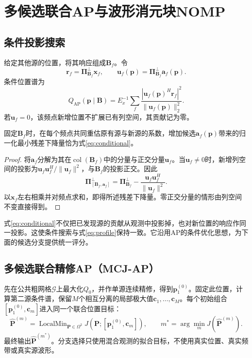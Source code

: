 \section{多候选联合AP与波形消元块NOMP}\label{sec:methods}
\subsection{条件投影搜索}
给定其他源的位置，将其响应组成$\bm B_f$。令
\begin{equation}
 \bm r_f=\bm\Pi_{\bm B_f}^{\perp}\bm x_f,\qquad
 \bm u_f(\bm p)=\bm\Pi_{\bm B_f}^{\perp}\bm a_f(\bm p).
\end{equation}
条件位置谱为
\begin{equation}
 Q_{\mathrm{AP}}(\bm p\mid\bm B)
 =E_x^{-1}\sum_f\frac{|\bm u_f(\bm p)^H\bm r_f|^2}
 {\|\bm u_f(\bm p)\|_2^2}.\label{eq:conditional}
\end{equation}
若$\bm u_f=0$，该频点新增位置不扩展已有列空间，其贡献记为零。

\begin{proposition}[条件谱与联合残差]\label{prop:conditional}
固定$\bm B_f$时，在每个频点共同重估原有源与新源的系数，增加候选$\bm a_f(\bm p)$带来的归一化最小残差下降量恰为式\eqref{eq:conditional}。
\end{proposition}
\begin{proof}
将$\bm a_f$分解为其在$\operatorname{col}(\bm B_f)$中的分量与正交分量$\bm u_f$。当$\bm u_f\ne0$时，新增列空间的投影为$\bm u_f\bm u_f^H/\|\bm u_f\|^2$，与$\bm B_f$的投影正交。因此
\begin{equation}
 \bm\Pi_{[\bm B_f,\bm a_f]}^{\perp}
 =\bm\Pi_{\bm B_f}^{\perp}
 -\frac{\bm u_f\bm u_f^H}{\|\bm u_f\|^2} .
\end{equation}
以$\bm x_f$左右相乘并对频点求和，即得所述残差下降量。零正交分量的情形由列空间不变直接得到。
\end{proof}

式\eqref{eq:conditional}不仅把已发现源的贡献从观测中投影掉，也对新位置的响应作同一投影。这使条件搜索与式\eqref{eq:profile}保持一致。它沿用AP的条件优化思想\cite{ChenHudsonYao2002}，为下面的候选分支提供统一评分。

\subsection{多候选联合精修AP（MCJ-AP）}\label{sec:mcj}
先在公共粗网格$\mathcal G$上最大化$Q_0$，并作单源连续精修，得到$\bm p_1^{(0)}$。固定此位置，计算第二源条件谱，保留$M$个相互分离的局部极大值$\bm c_1,\ldots,\bm c_M$。每个初始组合$[\bm p_1^{(0)},\bm c_m]$进入同一个联合位置目标：
\begin{equation}
 \widehat{\bm P}^{(m)}=\operatorname{LocalMin}_{\bm P\in\Omega^2}
 J(\bm P;[\bm p_1^{(0)},\bm c_m]),\qquad
 m^*=\arg\min_m J(\widehat{\bm P}^{(m)}).\label{eq:branch}
\end{equation}
最终输出$\widehat{\bm P}^{(m^*)}$。分支选择只使用混合观测的拟合目标，不使用真实位置、真实频带或真实源波形。

